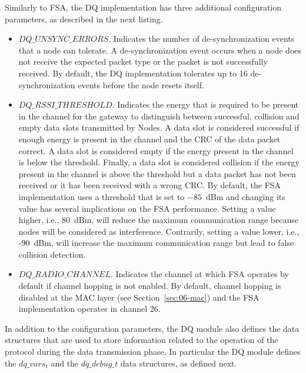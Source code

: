 Similarly to FSA, the DQ implementation has three additional configuration parameters, as described in the next listing.
\begin{itemize}
\item $DQ\_UNSYNC\_ERRORS$. Indicates the number of de-synchronization events that a node can tolerate. A de-synchronization event occurs when a node does not receive the expected packet type or the packet is not successfully received. By default, the DQ implementation tolerates up to 16 de-synchronization events before the node resets itself.
\item $DQ\_RSSI\_THRESHOLD$. Indicates the energy that is required to be present in the channel for the gateway to distinguish between successful, collision and empty data slots transmitted by Nodes. A data slot is considered successful if enough energy is present in the channel and the CRC of the data packet correct. A data slot is considered empty if the energy present in the channel is below the threshold. Finally, a data slot is considered collision if the energy present in the channel is above the threshold but a data packet has not been received or it has been received with a wrong CRC. By default, the FSA implementation uses a threshold that is set to $-85$~dBm and changing its value has several implications on the FSA performance. Setting a value higher, i.e., 80~dBm, will reduce the maximum communication range because nodes will be considered as interference. Contrarily, setting a value lower, i.e., -90~dBm, will increase the maximum communication range but lead to false collision detection. 
\item $DQ\_RADIO\_CHANNEL$. Indicates the channel at which FSA operates by default if channel hopping is not enabled. By default, channel hopping is disabled at the MAC layer (see Section~\ref{sec:06-mac}) and the FSA implementation operates in channel 26.
\end{itemize}

In addition to the configuration parameters, the DQ module also defines the data structures that are used to store information related to the operation of the protocol during the data transmission phase. In particular the DQ module defines the $dq\_vars_t$ and the $dq\_debug\_t$ data structures, as defined next.

